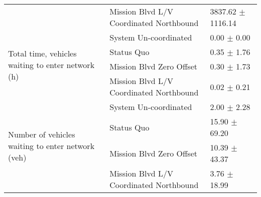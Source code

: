 \begin{table}
\begin{tabular}{lll}
 & Mission Blvd L/V Coordinated Northbound & 3837.62 $\pm$ 1116.14 \\
\multirow[t]{4}{*}{Total time, vehicles waiting to enter network (h)} & System Un-coordinated & 0.00 $\pm$ 0.00 \\
 & Status Quo & 0.35 $\pm$ 1.76 \\
 & Mission Blvd Zero Offset & 0.30 $\pm$ 1.73 \\
 & Mission Blvd L/V Coordinated Northbound & 0.02 $\pm$ 0.21 \\
\multirow[t]{4}{*}{Number of vehicles waiting to enter network (veh)} & System Un-coordinated & 2.00 $\pm$ 2.28 \\
 & Status Quo & 15.90 $\pm$ 69.20 \\
 & Mission Blvd Zero Offset & 10.39 $\pm$ 43.37 \\
 & Mission Blvd L/V Coordinated Northbound & 3.76 $\pm$ 18.99 \\
\bottomrule
\end{tabular}
\end{table}
